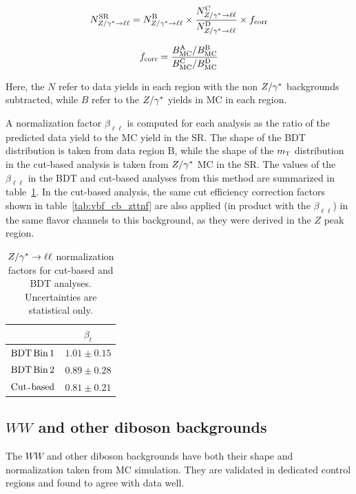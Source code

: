 \begin{equation}
N^{\rm SR}_{Z/\gamma^{\ast}\to\ell\ell} = N^{\rm B}_{Z/\gamma^{\ast}\to\ell\ell}  \times \frac{N^{\rm C}_{Z/\gamma^{\ast}\to\ell\ell}}{N^{\rm D}_{Z/\gamma^{\ast}\to\ell\ell} } \times f_{\rm corr}
\label{eqn:abcd}
\end{equation}

\begin{equation}
f_{\rm corr} = \frac{B_{\rm MC}^{\rm A}/B_{\rm MC}^{\rm B}}{B_{\rm MC}^{\rm C}/B_{\rm MC}^{\rm D}}
\label{eqn:nonclosure}
\end{equation}

Here, the $N$ refer to data yields in each region with the non $Z/\gamma^{\ast}$ backgrounds subtracted, while $B$ refer to the $Z/\gamma^{\ast}$ yields in MC in each region.

A normalization factor $\beta_{\ell\ell}$ is computed for each analysis as the ratio of the predicted data yield to the MC yield in the SR. The shape of the BDT distribution is taken from data region B, while the shape of the $m_{\textrm{\footnotesize\sc t}}$ distribution in the cut-based analysis is taken from $Z/\gamma^{\ast}$ MC in the SR. The values of the $\beta_{\ell\ell}$ in the BDT and cut-based analyses from this method are summarized in table~\ref{tab:vbf_sf_nf}. In the cut-based analysis, the same cut efficiency correction factors shown in table~\ref{tab:vbf_cb_zttnf} are also applied (in product with the $\beta_{\ell\ell}$) in the same flavor channels to this background, as they were derived in the $Z$ peak region. 

\begin{table}[h!]
\centering
\captionsetup{justification=centering}
\begin{tabular}{|c|c|}
\hline
& $\beta_t$ \\ \hline
$\rm BDT\,Bin\,1$ & $1.01 \pm 0.15$ \\ \hline
$\rm BDT\,Bin\,2$ & $0.89 \pm 0.28$ \\ \hline
$\rm Cut$-$\rm based$ & $0.81 \pm 0.21$ \\ \hline
\end{tabular}
\caption{$Z/\gamma^{\ast} \to \ell\ell$ normalization factors for cut-based and BDT analyses. Uncertainties are statistical only.}
\label{tab:vbf_sf_nf}
\end{table}

\subsection{$WW$ and other diboson backgrounds}

The $WW$ and other diboson backgrounds have both their shape and normalization taken from MC simulation. They are validated in dedicated control regions and found to agree with data well.

